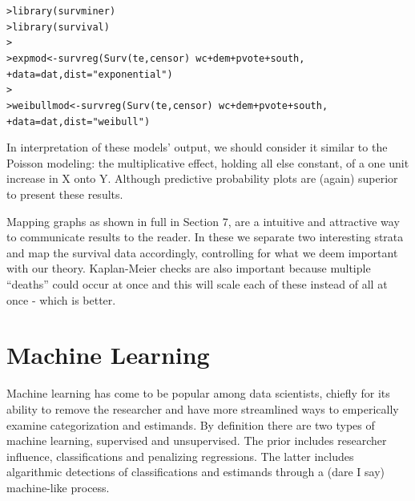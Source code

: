 \documentclass[12pt]{article}\usepackage[]{graphicx}\usepackage[]{color}
\makeatletter
\newcommand{\hlstr}[1]{\textcolor[rgb]{0.82,0.78,0.62}{#1}}%
\newcommand{\hlopt}[1]{\textcolor[rgb]{0.882,0.878,0.898}{#1}}%
\newcommand{\hlstd}[1]{\textcolor[rgb]{0.882,0.878,0.898}{#1}}%
\newcommand{\hlkwb}[1]{\textcolor[rgb]{0.902,0.675,0.196}{#1}}%
\newcommand{\hlkwc}[1]{\textcolor[rgb]{0.812,0.522,0.388}{#1}}%
\newcommand{\hlkwd}[1]{\textcolor[rgb]{0.733,0.388,0.812}{#1}}%
\newenvironment{kframe}{%
 \def\at@end@of@kframe{}%
 \ifinner\ifhmode%
  \def\at@end@of@kframe{\end{minipage}}%
  \begin{minipage}{\columnwidth}%
 \fi\fi%
 \def\FrameCommand##1{\hskip\@totalleftmargin \hskip-\fboxsep
 \colorbox{shadecolor}{##1}\hskip-\fboxsep
     \hskip-\linewidth \hskip-\@totalleftmargin \hskip\columnwidth}%
 \MakeFramed {\advance\hsize-\width
   \@totalleftmargin\z@ \linewidth\hsize
   \@setminipage}}%
 {\par\unskip\endMakeFramed%
 \at@end@of@kframe}
\newenvironment{knitrout}{}{} %
\makeatother
\begin{document}
\begin{flushleft}
\begin{knitrout}
\color{fgcolor}\begin{kframe}
\begin{alltt}
\hlstd{> }\hlkwd{library}\hlstd{(survminer)}
\hlstd{> }\hlkwd{library}\hlstd{(survival)}
\hlstd{> }
\hlstd{> }\hlstd{expmod} \hlkwb{<-} \hlkwd{survreg}\hlstd{(}\hlkwd{Surv}\hlstd{(te, censor)} \hlopt{~} \hlstd{wc} \hlopt{+} \hlstd{dem} \hlopt{+} \hlstd{pvote} \hlopt{+} \hlstd{south,}
\hlstd{+ }                  \hlkwc{data} \hlstd{= dat,} \hlkwc{dist} \hlstd{=} \hlstr{"exponential"}\hlstd{)}
\hlstd{> }
\hlstd{> }\hlstd{weibullmod} \hlkwb{<-} \hlkwd{survreg}\hlstd{(}\hlkwd{Surv}\hlstd{(te, censor)} \hlopt{~} \hlstd{wc} \hlopt{+} \hlstd{dem} \hlopt{+} \hlstd{pvote} \hlopt{+} \hlstd{south,}
\hlstd{+ }                  \hlkwc{data} \hlstd{= dat,} \hlkwc{dist} \hlstd{=} \hlstr{"weibull"}\hlstd{)}
\end{alltt}
\end{kframe}
\end{knitrout}



In interpretation of these models' output, we should consider it similar to the Poisson modeling: the multiplicative effect, holding all else constant, of a one unit increase in X onto Y. Although predictive probability plots are (again) superior to present these results.

Mapping graphs as shown in full in Section 7, are a intuitive and attractive way to communicate results to the reader. In these we separate two interesting strata and map the survival data accordingly, controlling for what we deem important with our theory. Kaplan-Meier  checks are also important because multiple ``deaths'' could occur at once and this will scale each of these instead of all at once - which is better.









\clearpage
\section{Machine Learning}

Machine learning has come to be popular among data scientists, chiefly for its ability to remove the researcher and have more streamlined ways to emperically examine categorization and estimands. By definition there are two types of machine learning, supervised and unsupervised. The prior includes researcher influence, classifications and penalizing regressions. The latter includes algarithmic detections of classifications and estimands through a (dare I say) machine-like process.


\end{flushleft}
\end{document}
